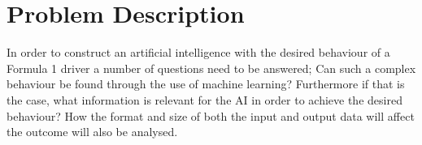 
\chapter{Problem Description}

        
  
%    
            

In order to construct an artificial intelligence with the desired behaviour of a Formula 1 driver a number of questions need to be answered; Can such a complex behaviour be found through the use of machine learning? Furthermore if that is the case, what information is relevant for the AI in order to achieve the desired behaviour? How the format and size of both the input and output data will affect the outcome will also be analysed.

